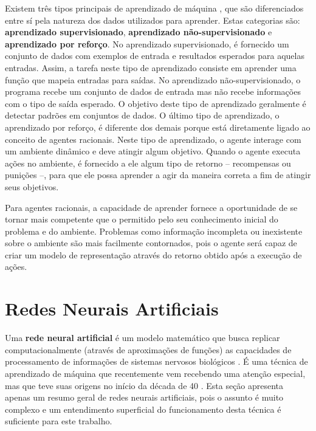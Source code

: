 Existem três tipos principais de aprendizado de máquina \cite[cap.
18]{RussellNorvig200912}, que são diferenciados entre sí pela natureza dos dados
utilizados para aprender. Estas categorias são: \textbf{aprendizado
supervisionado}, \textbf{aprendizado não-supervisionado} e \textbf{aprendizado
por reforço}. No aprendizado supervisionado, é fornecido um conjunto de dados
com exemplos de entrada e resultados esperados para aquelas entradas. Assim, a
tarefa neste tipo de aprendizado consiste em aprender uma função que mapeia
entradas para saídas. No aprendizado não-supervisionado, o programa recebe um
conjunto de dados de entrada mas não recebe informações com o tipo de saída
esperado. O objetivo deste tipo de aprendizado geralmente é detectar padrões em
conjuntos de dados.  O último tipo de aprendizado, o aprendizado por reforço, é
diferente dos demais porque está diretamente ligado ao conceito de agentes
racionais.  Neste tipo de aprendizado, o agente interage com um ambiente
dinâmico e deve atingir algum objetivo. Quando o agente executa ações no
ambiente, é fornecido a ele algum tipo de retorno -- recompensas ou punições --,
para que ele possa aprender a agir da maneira correta a fim de atingir seus
objetivos.

Para agentes racionais, a capacidade de aprender fornece a oportunidade de se
tornar mais competente que o permitido pelo seu conhecimento inicial do problema
e do ambiente. Problemas como informação incompleta ou inexistente sobre o
ambiente são mais facilmente contornados, pois o agente será capaz de criar um
modelo de representação através do retorno obtido após a execução de ações.


\section{\label{section:neural-networks}Redes Neurais Artificiais}
Uma \textbf{rede neural artificial} é um modelo matemático que busca replicar
computacionalmente (através de aproximações de funções) as capacidades de
processamento de informações de sistemas nervosos biológicos \cite[Cap.
1]{Rojas:1996:NNS:235222}. É uma técnica de aprendizado de máquina que
recentemente vem recebendo uma atenção especial, mas que teve suas origens no
início da década de 40 \cite[Cap. 18]{RussellNorvig200912}. Esta seção apresenta
apenas um resumo geral de redes neurais artificiais, pois o assunto é muito
complexo e um entendimento superficial do funcionamento desta técnica é
suficiente para este trabalho.

